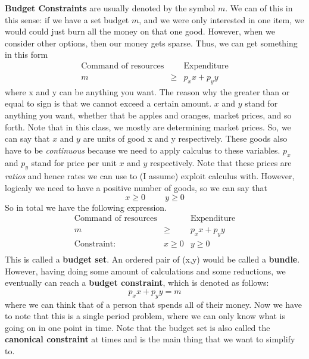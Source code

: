 \documentclass{article}
\begin{document}
\textbf{Budget Constraints} are usually denoted by the symbol $m$.  We can of this in this sense: if we have a set budget $m$, and we were only interested in one item, we would could just burn all the money on that one good. However, when we consider other options, then our money gets sparse. Thus, we can get something in this form 
\[
\begin{array}{ccc}
    \text{Command of resources} & \hspace{1pt} & \text{Expenditure} \\
    m & \geq & p_x x + p_y y
\end{array}
\]
where x and y can be anything you want. The reason why the greater than or equal to sign is that we cannot exceed a certain amount. $x$ and $y$ stand for anything you want, whether that be apples and oranges, market prices, and so forth. Note that in this class, we mostly are determining market prices. So, we can say that $x$ and $y$ are units of good x and y respectively. These goods also have to be \textit{continuous} because we need to apply calculus to these variables. $p_x$ and $p_y$ stand for price per unit $x$ and $y$ respectively. Note that these prices are \textit{ratios} and hence rates we can use to (I assume) exploit calculus with. However, logicaly we need to have a positive number of goods, so we can say that 
\[
x \geq 0 \hspace{1cm} y \geq 0
\]
So in total we have the following expression. 
\[
\begin{array}{ccc}
     \text{Command of resources} & \hspace{1pt}  & \text{Expenditure} \\
     m & \geq & p_x x + p_y y\\
     \text{Constraint:} & x \geq 0 & y \geq 0\\ 
\end{array}
\]
This is called a \textbf{budget set}. An ordered pair of (x,y) would be called a \textbf{bundle}. However, having doing some amount of calculations and some reductions, we eventually can reach a \textbf{budget constraint}, which is denoted as follows:
\[
p_x x + p_y y = m
\]
where we can think that of a person that spends all of their money. Now we have to note that this is a single period problem, where we can only know what is going on in one point in time. Note that the budget set is also called the \textbf{canonical constraint} at times and is the main thing that we want to simplify to.\\
\end{document}
